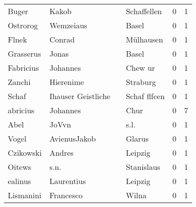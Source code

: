 \begin{center}
\begin{tiny}
\begin{longtabu}{llllrr}
                    Buger &                              Kakob &             &                                 Schaffellen &          0 &         1 \\
                 Ostrorog &                          Wemzeiaus &             &                                       Basel &          0 &         1 \\
                    Flnek &                             Conrad &             &                                   Mülhausen &          0 &         1 \\
                Grasserus &                              Jonas &             &                                       Basel &          0 &         1 \\
                Fabricius &                           Johannes &             &                                     Chew ur &          0 &         1 \\
                   Zanchi &                          Hierenime &             &                                    Straburg &          0 &         1 \\
                    Schaf &                 Ihauser Geistliche &             &                                Schaf flfcen &          0 &         1 \\
                 abricius &                           Johannes &             &                                        Chur &          0 &         7 \\
                     Abel &                              JoVvn &             &                                        s.l. &          0 &         1 \\
                    Vogel &                       AvienusJakob &             &                                      Glarus &          0 &         1 \\
                Czikowski &                             Andres &             &                                     Leipzig &          0 &         1 \\
                   Oitews &                               s.n. &             &                                  Stanislaus &          0 &         1 \\
                  ealinus &                         Laurentius &             &                                     Leipzig &          0 &         1 \\
                Lismanini &                          Francesco &             &                                       Wilna &          0 &         1 \\

\end{longtabu}
\end{tiny}
\end{center}
